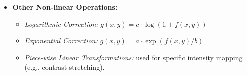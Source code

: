 \begin{itemize}
    \item \textbf{Other Non-linear Operations:}
        \begin{itemize}
            \item \emph{Logarithmic Correction:} $g(x, y) = c \cdot \log(1 + f(x, y))$
            \item \emph{Exponential Correction:} $g(x, y) = a \cdot \exp(f(x, y)/b)$
            \item \emph{Piece-wise Linear Transformations:} used for specific intensity mapping (e.g., contrast stretching).
        \end{itemize}
\end{itemize}



